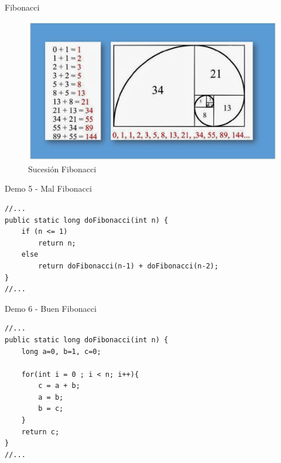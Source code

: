 \documentclass{beamer}
\begin{document}
\begin{frame}{Fibonacci}
\begin{figure}
	\centering
	\includegraphics[width=0.7\linewidth]{Images/fibonacci}
	\caption{Sucesión Fibonacci}
	\label{fig:fibonacci}
\end{figure}
\end{frame}

\begin{frame}[fragile]{Demo 5 - Mal Fibonacci}
\begin{lstlisting}
//...
public static long doFibonacci(int n) {
	if (n <= 1)
		return n;
	else
		return doFibonacci(n-1) + doFibonacci(n-2);
}
//...
\end{lstlisting}
\end{frame}

\begin{frame}[fragile]{Demo 6 - Buen Fibonacci}
\begin{lstlisting}
//...
public static long doFibonacci(int n) {
	long a=0, b=1, c=0;
	
	for(int i = 0 ; i < n; i++){
		c = a + b;
		a = b;
		b = c;
	}
	return c;
}
//...
\end{lstlisting}
\end{frame}
\end{document}
